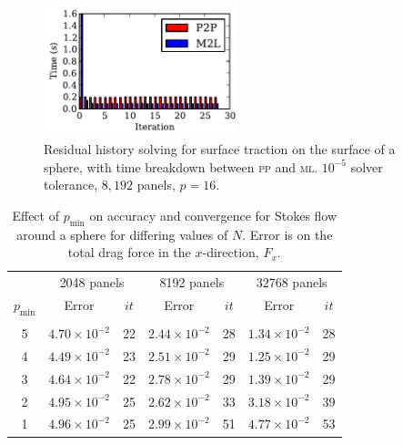 \documentclass[final,leqno,]{siamltex1213}
\newcommand{\mtol}{\textsc{m}\texttwooldstyle\textsc{l}\xspace} %
\newcommand{\ptop}{\textsc{p}\texttwooldstyle\textsc{p}\xspace} %
\newcommand{\pmin}{p_{\text{min}}}
\begin{document}
\begin{figure}%
\begin{center}
	\includegraphics[natwidth=3in,natheight=2in,width=0.5\textwidth]{StokesSolveBreakdown.pdf}
	\caption{Residual history solving for surface traction on the surface of a sphere, with time breakdown between {\ptop} and {\mtol}. $10^{-5}$ solver tolerance, $8,192$ panels, $p=16$.}
	\label{fig:stokes_relaxation_breakdown}
\end{center}
\end{figure}



\begin{table}[ht]
\footnotesize
\begin{center}
\begin{tabular}{c|cc|cc|cc}
  & \multicolumn{2}{c|}{2048 panels} & \multicolumn{2}{c|}{8192 panels} & \multicolumn{2}{c}{32768 panels} \\
 $\pmin$ & Error & $it$ & Error & $it$ & Error & $it$ \\ \hline
  & & & & & & \\
 5 & $4.70\times 10^{-2}$ & 22 & $2.44\times 10^{-2}$ & 28 & $1.34\times 10^{-2}$ & 28 \\
 4 & $4.49\times 10^{-2}$ & 23 & $2.51\times 10^{-2}$ & 29 & $1.25\times 10^{-2}$ & 29 \\
 3 & $4.64\times 10^{-2}$ & 22 & $2.78\times 10^{-2}$ & 29 & $1.39\times 10^{-2}$ & 29 \\
 2 & $4.95\times 10^{-2}$ & 25 & $2.62\times 10^{-2}$ & 33 & $3.18\times 10^{-2}$ & 39 \\
 1 & $4.96\times 10^{-2}$ & 25 & $2.99\times 10^{-2}$ & 51 & $4.77\times 10^{-2}$ & 53 
\end{tabular}
\end{center}
\caption{Effect of $p_{\text{min}}$ on accuracy and convergence for Stokes flow around a sphere for differing values of $N$. Error is on the total drag force in the $x$-direction, $F_x$.}
\label{tab:stokes_min_p}
\end{table}%
\end{document}
